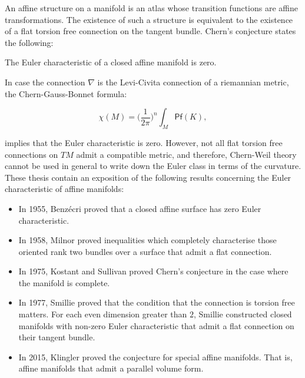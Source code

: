 An affine structure on a manifold is an atlas whose transition functions are affine transformations. The existence of such a structure is equivalent to the existence of a flat torsion free connection on the tangent bundle. Chern's conjecture states the following:

\begin{conjecture}
	The Euler characteristic of a closed affine manifold is zero.
\end{conjecture}
In case the connection $\nabla$ is the Levi-Civita connection of a riemannian metric, the Chern-Gauss-Bonnet formula:

\[ \chi(M)= \Big(\frac{1}{2\pi}\Big)^n \int_M \mathsf{Pf}(K),\]

\noindent implies that the Euler characteristic is zero. However, not all flat torsion free connections on $TM$ admit a compatible metric, and therefore, Chern-Weil theory cannot be used in general to write down the Euler class in terms of the curvature.\\

These thesis contain an exposition of the following results concerning  the Euler characteristic of affine manifolds:
\begin{itemize}
	\item In 1955, Benz\'ecri \cite{B} proved that a closed affine surface has zero Euler characteristic.
	
	\item In 1958, Milnor \cite{Milnor} proved inequalities which completely characterise those oriented rank two bundles over a surface that admit a flat connection.
	
	\item In 1975, Kostant and Sullivan \cite{KS} proved Chern's conjecture in the case where the manifold is complete.
	
	\item In 1977, Smillie \cite{Smillie} proved that the condition that the connection is torsion free matters. For each even dimension greater than $2$, Smillie constructed closed manifolds with non-zero Euler characteristic that admit a flat connection on their tangent bundle.
	
	
	
	\item In 2015, Klingler \cite{K} proved the conjecture for special affine manifolds. That is, affine manifolds that admit a parallel volume form.
	
\end{itemize}

